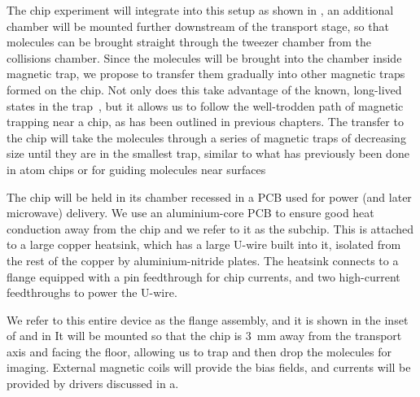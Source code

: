 The chip experiment will integrate into this setup as shown in
, an additional chamber will be mounted
further downstream of the transport stage, so that molecules can be brought
straight through the tweezer chamber from the collisions chamber.  Since the
molecules will be brought into the chamber inside magnetic trap, we propose to
transfer them gradually into other magnetic traps formed on the chip.
%
Not only does this take advantage of the known, long-lived \CaF{} states in the
trap~\cite{WilliamsMagnetic2018}, but it allows us to follow the well-trodden
path of magnetic trapping near a chip, as has been outlined in previous
chapters.  The transfer to the chip will take the molecules through a series of
magnetic traps of decreasing size until they are in the smallest trap, similar
to what has previously been done in atom chips \cite{Reichel1999} or for
guiding molecules near surfaces \cite{Meek2009}

The chip will be held in its chamber recessed in a PCB used for power (and
later microwave) delivery. We use an aluminium-core PCB to ensure good heat
conduction away from the chip and we refer to it as the subchip.  This is
attached to a large copper heatsink, which has a large U-wire built into it,
isolated from the rest of the copper by aluminium-nitride plates. The heatsink
connects to a flange equipped with a  pin feedthrough for chip currents,
and two high-current feedthroughs to power the U-wire.

We refer to this entire device as the flange assembly, and it is shown in the
inset of  and in
 It will be mounted so that the chip is
\SI{3}{\milli\meter} away from the transport axis and facing the floor,
allowing us to trap and then drop the molecules for imaging.  External magnetic
coils will provide the bias fields, and currents will be provided by drivers
discussed in  {a}.

